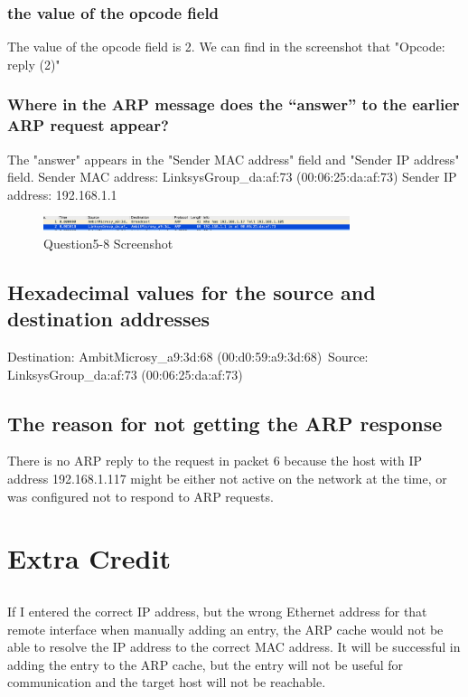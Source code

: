 \documentclass{article}
\begin{document}
\begin{CJK*}{UTF8}{gbsn}
\subsubsection{the value of the opcode field}
The value of the opcode field is 2. We can find
in the screenshot that "Opcode: reply (2)"
\subsubsection{Where in the ARP message does the “answer” to the earlier ARP request appear?}
The "answer" appears in the "Sender MAC address" field and "Sender IP address" field.
Sender MAC address: LinksysGroup\_da:af:73 (00:06:25:da:af:73) Sender IP address: 192.168.1.1
\begin{figure}[H]
    \centering
    \includegraphics[width=0.8\textwidth]{13.png}
    \caption{Question5-8 Screenshot}
\end{figure}
\subsection{Hexadecimal values for the source and destination addresses}
Destination: AmbitMicrosy\_a9:3d:68 (00:d0:59:a9:3d:68)\
Source: LinksysGroup\_da:af:73 (00:06:25:da:af:73)

\subsection{The reason for not getting the ARP response}
There is no ARP reply to the request in packet 6 
because the host with IP address 192.168.1.117 might be either not active on the network at the time, or was configured not to respond to ARP requests. 


\section{Extra Credit}
\subsection{}
If I entered the correct IP address, but the wrong Ethernet address for that remote interface when manually adding an entry,
the ARP cache would not be able to resolve the IP address to the correct MAC address. It will be successful in adding the entry to the ARP cache, 
but the entry will not be useful for communication and the target host will not be reachable.
\end{CJK*}
\end{document}
